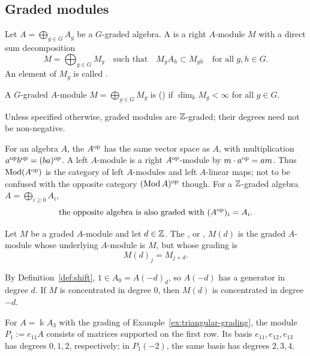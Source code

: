 \subsection{Graded modules}

\begin{definition}\label{def:graded-module}
Let $A=\bigoplus_{g\in G}A_g$ be a $G$-graded algebra.
A  is a right $A$-module $M$ with a direct sum decomposition
\[
M=\bigoplus_{g\in G}M_g
\quad\text{such that}\quad
M_gA_h\subset M_{gh}
\quad\text{for all }g,h\in G.
\]
An element of $M_g$ is called .

A $G$-graded $A$-module $M=\bigoplus_{g\in G} M_g$ is  () if $\dim_{\Bbbk} M_g <\infty$ for all $g\in G$.
\end{definition}

Unless specified otherwise, graded modules are $\mathbb{Z}$-graded; their degrees need not be non-negative.

\label{not:opposite-algebra}
For an algebra $A$, the  $A^{\mathrm{op}}$ has the same vector space as $A$, with multiplication $a^{\mathrm{op}} b^{\mathrm{op}}=(ba)^{\mathrm{op}}$.
A left $A$-module is a right $A^{\mathrm{op}}$-module by $m\cdot a^{\mathrm{op}}=am$.
Thus $\operatorname{\mathrm{Mod}}(A^{\mathrm{op}})$ is the category of left $A$-modules and left $A$-linear maps; not to be confused with the opposite category $(\operatorname{\mathrm{Mod}} A)^{\mathrm{op}}$ though.
For a $\mathbb{Z}$-graded algebra $A=\bigoplus_{i\ge 0}A_i$, 
\[
\text{the opposite algebra is also graded with $(A^{\mathrm{op}})_i=A_i$.}
\]



\begin{definition}\label{def:shift}
Let $M$ be a graded $A$-module and let $d\in\mathbb{Z}$.
The , or , $M(d)$ is the graded $A$-module whose underlying $A$-module is $M$, but whose grading is
\[
M(d)_j=M_{j+d}.
\]
\end{definition}

By Definition~\ref{def:shift}, $1\in A_0=A(-d)_d$, so $A(-d)$ has a generator in degree $d$.
If $M$ is concentrated in degree $0$, then $M(d)$ is concentrated in degree $-d$.

\begin{example}\label{ex:shifted-row}
For $A=\Bbbk A_3$ with the grading of Example~\ref{ex:triangular-grading}, the module $P_1:=e_{11}A$ consists of matrices supported on the first row.
Its basis $e_{11},e_{12},e_{13}$ has degrees $0,1,2$, respectively; in $P_1(-2)$, the same basis has degrees $2,3,4$.
\end{example}

